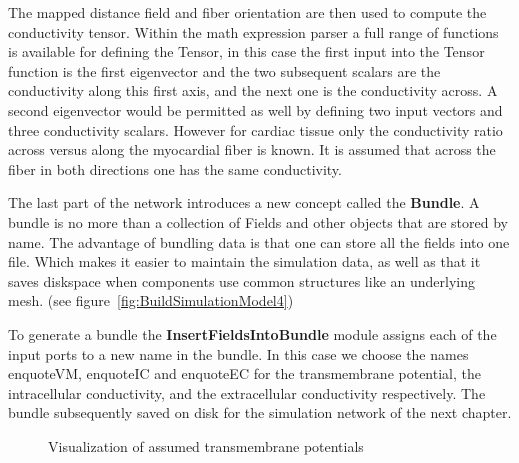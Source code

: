 \documentclass[fleqn,11pt,openany]{book}
\begin{document}
The mapped distance field and fiber orientation are then used to compute the conductivity tensor. Within the math expression parser a full range of functions is available for defining the Tensor, in this case the first input into the Tensor function is the first eigenvector and the two subsequent scalars are the conductivity along this first axis, and the next one is the conductivity across. A second eigenvector would be permitted as well by defining two input vectors and three conductivity scalars. However for cardiac tissue only the conductivity ratio across versus along the myocardial fiber is known. It is assumed that across the fiber in both directions one has the same conductivity. 

The last part of the network introduces a new concept called the {\bf Bundle}. A bundle is no more than a collection of Fields and other objects that are stored by name. The advantage of bundling data is that one can store all the fields into one file. Which makes it easier to maintain the simulation data, as well as that it saves diskspace when components use common structures like an underlying mesh. (see figure~\ref{fig:BuildSimulationModel4})

To generate a bundle the {\bf InsertFieldsIntoBundle} module assigns each of the input ports to a new name in the bundle. In this case we choose the names enquote{VM}, enquote{IC} and enquote{EC} for the transmembrane potential, the intracellular conductivity, and the extracellular conductivity respectively. The bundle subsequently saved on disk for the simulation network of the next chapter.

\begin{figure}
\caption{Visualization of assumed transmembrane potentials}\label{fig:ModelOfVM}
\end{figure}
\end{document}
